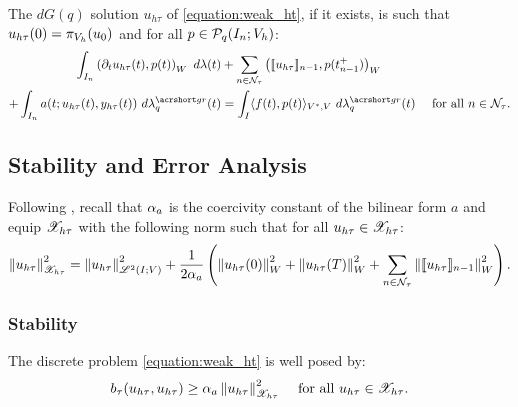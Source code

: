\begin{proposition}[Localization]
    The $dG(q)$ solution $u_{h \tau}$ of \cref{equation:weak_ht}, if it exists, is such that $u_{h \tau}(0) = \pi_{V_h}(u_0)$ and for all $p \in \mathcal{P}_{q}(I_n; V_h)$:
    \begin{align}
        \int_{I_n} \left( \partial_t u_{h \tau}(t), p(t) \right)_W ~ d \lambda(t) & + \sum_{n \in \TimeIndices} \left( \llbracket u_{h \tau} \rrbracket_{n - 1}, p(t_{n - 1}^+) \right)_W \notag \\
        + \int_{I_n} a(t; u_{h \tau}(t), y_{h \tau}(t)) ~ d \lambdaGR_q(t) & = \int_I \langle f(t), p(t) \rangle_{V^*, V} ~ d \lambdaGR_q(t) &\text{ for all } n \in \TimeIndices.
    \end{align}
\end{proposition}

\newpage
\subsection{Stability and Error Analysis} \label{subsection:method_analysis}

Following \cite[p.~186]{Ern2021}, recall that $\alpha_{a}$ is the coercivity constant of the bilinear form $a$ and equip $\mathscr{X}_{h \tau}$ with the following norm such that for all $u_{h \tau} \in \mathscr{X}_{h \tau}$:
\begin{align}
    \left\lVert u_{h \tau} \right\rVert_{\mathscr{X}_{h \tau}}^2 = \left\lVert u_{h \tau} \right\rVert_{\mathscr{L}^{2}(I; V)}^2 + \frac{1}{2 \alpha_{a}} \left( \left\lVert u_{h \tau}(0) \right\rVert_W^2 + \left\lVert u_{h \tau}(T) \right\rVert_W^2 + \sum_{n \in \mathcal{N}_{\tau}} \left\lVert \llbracket u_{h \tau} \rrbracket_{n - 1} \right\rVert_W^2 \right). \label{eq:norm_ht}
\end{align}

\subsubsection{Stability}

\begin{lemma}[Coercivity]
    The discrete problem \cref{equation:weak_ht} is well posed by:
    \begin{align}
        b_{\tau}(u_{h \tau}, u_{h \tau}) &\geq \alpha_{a} \left\lVert u_{h \tau} \right\rVert_{\mathscr{X}_{h \tau}}^2 &\text{ for all } u_{h \tau} \in \mathscr{X}_{h \tau}. \label{eq:b_coercivity}
    \end{align}
\end{lemma}

